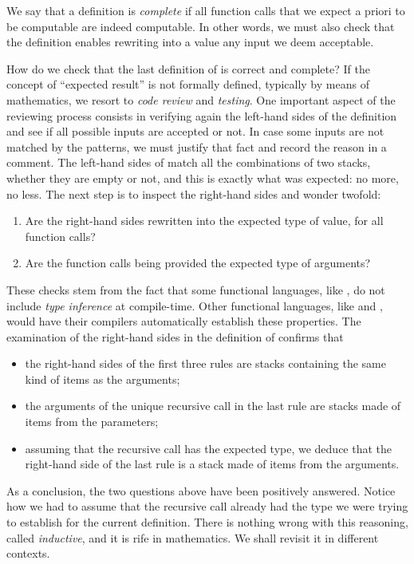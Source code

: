 We say that a definition is \emph{complete} if all function calls that
we expect a priori to be computable are indeed computable. In other
words, we must also check that the definition enables rewriting into a
value any input we deem acceptable.

How do we check that the last definition of  is correct
and complete? If the concept of ``expected result'' is not formally
defined, typically by means of mathematics, we resort to \emph{code
  review} and \emph{testing}. One important aspect of the reviewing
process consists in verifying again the left\hyp{}hand sides of the
definition and see if all possible inputs are accepted or not. In case
some inputs are not matched by the patterns, we must justify that fact
and record the reason in a comment. The left\hyp{}hand sides of
 match all the combinations of two stacks, whether they
are empty or not, and this is exactly what was expected: no more, no
less. The next step is to inspect the right\hyp{}hand sides and wonder
twofold:
\begin{enumerate}

  \item Are the right\hyp{}hand sides rewritten into the expected type
    of value, for all function calls?

  \item Are the function calls being provided the expected type of
    arguments?

\end{enumerate}
These checks stem from the fact that some functional languages, like
\Erlang, do not include \emph{type inference} at
compile\hyp{}time. Other functional languages, like \OCaml and
\Haskell, would have their compilers automatically establish these
properties. The examination of the right\hyp{}hand sides in the
definition of  confirms that
\begin{itemize}

\item the right\hyp{}hand sides of the first three rules are stacks
  containing the same kind of items as the arguments;

\item the arguments of the unique recursive call in the last rule
  are stacks made of items from the parameters;

\item assuming that the recursive call has the expected type, we
  deduce that the right\hyp{}hand side of the last rule is a stack
  made of items from the arguments.

\end{itemize}
As a conclusion, the two questions above have been positively
answered. Notice how we had to assume that the recursive call already
had the type we were trying to establish for the current
definition. There is nothing wrong with this reasoning, called
\emph{inductive}, and it is rife in mathematics. We shall revisit it
in different contexts.

